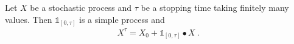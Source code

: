 \begin{lemma}\label{lem:stoppedProcess_eq_elemStochIntegral}
Let $X$ be a stochastic process and $τ$ be a stopping time taking finitely many values.
Then $\mathbb{1}_{[0, τ]}$ is a simple process and
\begin{align*}
  X^τ = X_0 + \mathbb{1}_{[0, τ]} \bullet X
  \: .
\end{align*}
\end{lemma}


